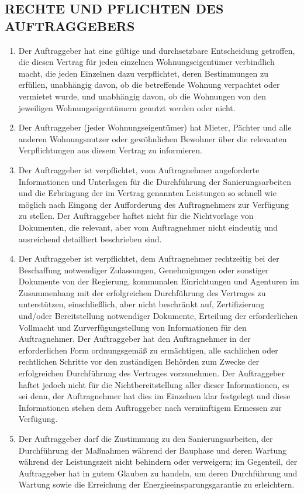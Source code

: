 \begin{multicols}{2}
  \subsection{RECHTE UND PFLICHTEN DES AUFTRAGGEBERS}
  \begin{enumerate}
   \item Der Auftraggeber hat eine gültige und durchsetzbare Entscheidung getroffen, die diesen Vertrag für jeden einzelnen Wohnungseigentümer verbindlich macht, die jeden Einzelnen dazu verpflichtet, deren Bestimmungen zu erfüllen, unabhängig davon, ob die betreffende Wohnung verpachtet oder vermietet wurde, und unabhängig davon, ob die Wohnungen von den jeweiligen Wohnungseigentümern genutzt werden oder nicht.
   \item Der Auftraggeber (jeder Wohnungseigentümer) hat Mieter, Pächter und alle anderen Wohnungsnutzer oder gewöhnlichen Bewohner über die relevanten Verpflichtungen aus diesem Vertrag zu informieren.
   \item Der Auftraggeber ist verpflichtet, vom Auftragnehmer angeforderte Informationen und Unterlagen für die Durchführung der Sanierungsarbeiten und die Erbringung der im Vertrag genannten Leistungen so schnell wie möglich nach Eingang der Aufforderung des Auftragnehmers zur Verfügung zu stellen. Der Auftraggeber haftet nicht für die Nichtvorlage von Dokumenten, die relevant, aber vom Auftragnehmer nicht eindeutig und ausreichend detailliert beschrieben sind.
   \item Der Auftraggeber ist verpflichtet, dem Auftragnehmer rechtzeitig bei der Beschaffung notwendiger Zulassungen, Genehmigungen oder sonstiger Dokumente von der Regierung, kommunalen Einrichtungen und Agenturen im Zusammenhang mit der erfolgreichen Durchführung des Vertrages zu unterstützen, einschließlich, aber nicht beschränkt auf, Zertifizierung und/oder Bereitstellung notwendiger Dokumente, Erteilung der erforderlichen Vollmacht und Zurverfügungstellung von Informationen für den Auftragnehmer. Der Auftraggeber hat den Auftragnehmer in der erforderlichen Form ordnungsgemäß zu ermächtigen, alle sachlichen oder rechtlichen Schritte vor den zuständigen Behörden zum Zwecke der erfolgreichen Durchführung des Vertrages vorzunehmen. Der Auftraggeber haftet jedoch nicht für die Nichtbereitstellung aller dieser Informationen, es sei denn, der Auftragnehmer hat dies im Einzelnen klar festgelegt und diese Informationen stehen dem Auftraggeber nach vernünftigem Ermessen zur Verfügung.
   \item Der Auftraggeber darf die Zustimmung zu den Sanierungsarbeiten, der Durchführung der Maßnahmen während der Bauphase und deren Wartung während der Leistungszeit nicht behindern oder verweigern; im Gegenteil, der Auftraggeber hat in gutem Glauben zu handeln, um deren Durchführung und Wartung sowie die Erreichung der Energieeinsparungsgarantie zu erleichtern.

\end{enumerate}
\end{multicols}
